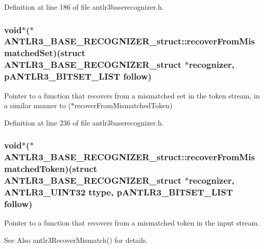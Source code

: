 Definition at line 186 of file antlr3baserecognizer.\-h.

\hypertarget{struct_a_n_t_l_r3___b_a_s_e___r_e_c_o_g_n_i_z_e_r__struct_a0edf91687d5ef5507f94d9861ee514cc}{
\subsubsection[{recover\-From\-Mismatched\-Set}]{\setlength{\rightskip}{0pt plus 5cm}void$\ast$($\ast$ A\-N\-T\-L\-R3\-\_\-\-B\-A\-S\-E\-\_\-\-R\-E\-C\-O\-G\-N\-I\-Z\-E\-R\-\_\-struct\-::recover\-From\-Mismatched\-Set)(struct {\bf A\-N\-T\-L\-R3\-\_\-\-B\-A\-S\-E\-\_\-\-R\-E\-C\-O\-G\-N\-I\-Z\-E\-R\-\_\-struct} $\ast${\bf recognizer}, {\bf p\-A\-N\-T\-L\-R3\-\_\-\-B\-I\-T\-S\-E\-T\-\_\-\-L\-I\-S\-T} {\bf follow})}}\label{struct_a_n_t_l_r3___b_a_s_e___r_e_c_o_g_n_i_z_e_r__struct_a0edf91687d5ef5507f94d9861ee514cc}
Pointer to a function that recovers from a mismatched set in the token stream, in a similar manner to ($\ast$recover\-From\-Mismatched\-Token) 

Definition at line 236 of file antlr3baserecognizer.\-h.

\hypertarget{struct_a_n_t_l_r3___b_a_s_e___r_e_c_o_g_n_i_z_e_r__struct_ae7d73ad15b172396aefd64d0b7316f1e}{
\subsubsection[{recover\-From\-Mismatched\-Token}]{\setlength{\rightskip}{0pt plus 5cm}void$\ast$($\ast$ A\-N\-T\-L\-R3\-\_\-\-B\-A\-S\-E\-\_\-\-R\-E\-C\-O\-G\-N\-I\-Z\-E\-R\-\_\-struct\-::recover\-From\-Mismatched\-Token)(struct {\bf A\-N\-T\-L\-R3\-\_\-\-B\-A\-S\-E\-\_\-\-R\-E\-C\-O\-G\-N\-I\-Z\-E\-R\-\_\-struct} $\ast${\bf recognizer}, {\bf A\-N\-T\-L\-R3\-\_\-\-U\-I\-N\-T32} ttype, {\bf p\-A\-N\-T\-L\-R3\-\_\-\-B\-I\-T\-S\-E\-T\-\_\-\-L\-I\-S\-T} {\bf follow})}}\label{struct_a_n_t_l_r3___b_a_s_e___r_e_c_o_g_n_i_z_e_r__struct_ae7d73ad15b172396aefd64d0b7316f1e}
Pointer to a function that recovers from a mismatched token in the input stream. \begin{DoxySeeAlso}{See Also}
antlr3\-Recover\-Mismatch() for details. 
\end{DoxySeeAlso}



